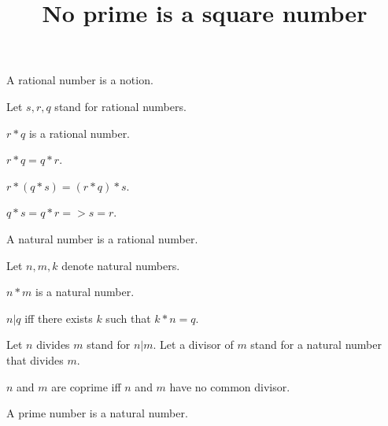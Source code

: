 \documentclass{article}
\title{No prime is a square number}
\author{}
\date{}
\begin{document}

  \maketitle

  \begin{forthel}

    \begin{signature}
      A rational number is a notion.
    \end{signature}

    Let $s,r,q$ stand for rational numbers.

    \begin{signature}
      $r * q$ is a rational number.
    \end{signature}

    \begin{axiom}
      $r * q = q * r$.
    \end{axiom}

    \begin{axiom}
      $r * (q * s) = (r * q) * s$.
    \end{axiom}

    \begin{axiom}
      $q * s = q * r => s = r$.
    \end{axiom}

    \begin{signature}
      A natural number is a rational number.
    \end{signature}

    Let $n,m,k$ denote natural numbers.

    \begin{axiom}
      $n * m$ is a natural number.
    \end{axiom}

    \begin{definition}
      $n | q$ iff there exists $k$ such that $k * n = q$.
    \end{definition}

    Let $n$ divides $m$ stand for $n | m$. Let a divisor of $m$ stand for a natural number that divides $m$.

    \begin{definition}
      $n$ and $m$ are coprime iff $n$ and $m$ have no common divisor.
    \end{definition}

    \begin{signature}
      A prime number is a natural number.
    \end{signature}


\end{forthel}
\end{document}
